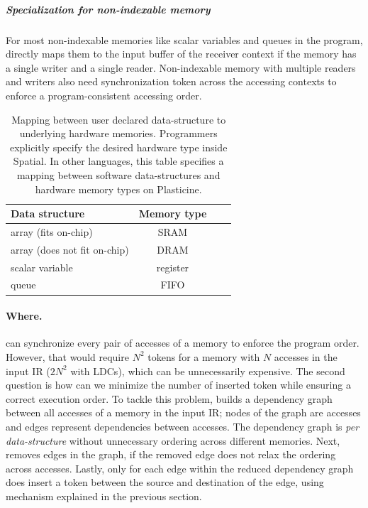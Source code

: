 \subparagraph{Specialization for non-indexable memory}
For most non-indexable memories like scalar variables and queues in the program, \name directly maps
them to the input buffer of the receiver context if the memory has a single writer and a single
reader.
Non-indexable memory with multiple readers and writers also need synchronization token across
the accessing contexts to enforce a program-consistent accessing order.

\begin{table}
  \centering
\begin{tabular}{lccc}
  \toprule
 Data structure & Memory type \\ \midrule
  array (fits on-chip) & SRAM \\
  array (does not fit on-chip) & DRAM \\
  scalar variable & register \\
  queue & FIFO \\
 \bottomrule
\end{tabular}
\caption[Mapping between data-structure to hardware memories]{
  Mapping between user declared data-structure to underlying hardware memories. 
  Programmers explicitly specify the desired hardware type inside Spatial. 
  In other languages, this table specifies a mapping between software data-structures 
  and hardware memory types on Plasticine.
}
\label{tab:memtype}
\end{table}

\paragraph{Where.}
\name can synchronize every pair of accesses of a memory to enforce the program order. However, that
would require $N^2$ tokens for a memory with $N$ accesses in the input IR ($2N^2$ with LDCs), which can be
unnecessarily expensive.
The second question is how can we minimize the number of inserted token while ensuring a correct
execution order.
To tackle this problem, \name builds a dependency graph between all accesses of a memory in the input IR; 
nodes of the graph are accesses and edges represent dependencies between accesses.
The dependency graph is \emph{per data-structure} without unnecessary ordering across different memories.
Next, \name removes edges in the graph, if the removed edge does not relax the ordering
across accesses.
Lastly, only for each edge within the reduced dependency graph does \name insert a token
between the source and destination of the edge, using mechanism explained in the previous section.

